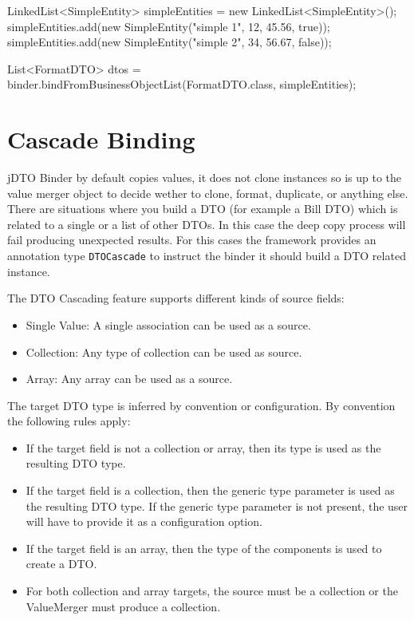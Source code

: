 \documentclass[11pt]{article}
\newcommand{\JDTO}{jDTO Binder\xspace}
\begin{document}
\begin{java}
LinkedList<SimpleEntity> simpleEntities = 
    new LinkedList<SimpleEntity>();
simpleEntities.add(new SimpleEntity("simple 1", 12, 45.56, true));
simpleEntities.add(new SimpleEntity("simple 2", 34, 56.67, false));

List<FormatDTO> dtos = binder.bindFromBusinessObjectList(FormatDTO.class, simpleEntities);
\end{java}

\section{Cascade Binding}


\JDTO by default copies values, it does not clone instances so is up to the value merger object to decide wether to clone, format, duplicate, or anything else. 
There are situations where you build a DTO (for example a Bill DTO) which is related to a single or a list of other DTOs. In this case the deep copy process will fail producing unexpected results. For this cases the framework provides an annotation type \texttt{DTOCascade} to instruct the binder it should build a DTO related instance.

The DTO Cascading feature supports different kinds of source fields:

\begin{itemize}
\item Single Value: A single association can be used as a source.
\item Collection: Any type of collection can be used as source.
\item Array: Any array can be used as a source. 
\end{itemize}


The target DTO type is inferred by convention or configuration. By convention the following rules apply:


\begin{itemize}
 \item If the target field is not a collection or array, then its type is used as the resulting DTO type.
 \item If the target field is a collection, then the generic type parameter is used as the resulting DTO type. If the generic type parameter is not present, the user will have to provide it as a configuration option.
 \item If the target field is an array, then the type of the components is used to create a DTO.
 \item For both collection and array targets, the source must be a collection or the ValueMerger must produce a collection.
\end{itemize}
\end{document}
